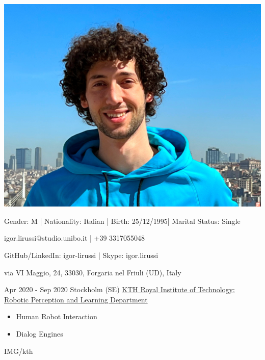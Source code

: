 \documentclass[paper=a4,fontsize=11pt, hidelinks]{temp} %
\begin{document}
\begin{minipage}{.2\linewidth}
   \includegraphics[width=1\textwidth]{photo} %
\end{minipage}      
\begin{minipage}{0.7\linewidth}
   \sepspace
   \noindent
   \hfill Gender: M | Nationality: Italian | Birth: 25/12/1995| Marital Status: Single
   
   \hfill igor.lirussi@studio.unibo.it | +39 3317055048 
   
   \hfill GitHub/LinkedIn: igor-lirussi | Skype: igor.lirussi
   
   \hfill via VI Maggio, 24, 33030, Forgaria nel Friuli (UD), Italy
 
\end{minipage}


\noindent

{Apr 2020 - Sep 2020}
{Stockholm (SE) \href{https://www.kth.se/is/rpl}{KTH Royal Institute of Technology: Robotic Perception and Learning Department}}
{
 \begin{itemize}
    \item Human Robot Interaction
    \item Dialog Engines
 \end{itemize}
} {IMG/kth}

\sepspace
\end{document}
